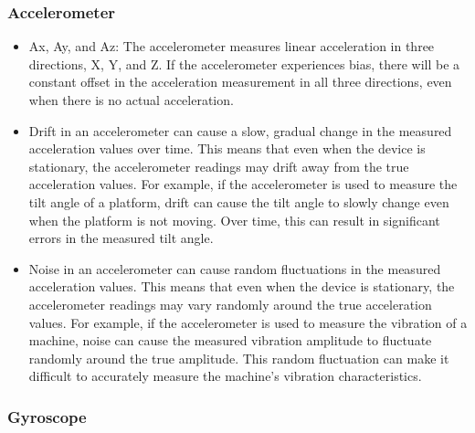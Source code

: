 \subsubsection{Accelerometer}
\begin{itemize}
	\item Ax, Ay, and Az: The accelerometer measures linear acceleration in three directions, X, Y, and Z. If the accelerometer experiences bias, there will be a constant offset in the acceleration measurement in all three directions, even when there is no actual acceleration. 
	\item Drift in an accelerometer can cause a slow, gradual change in the measured acceleration values over time. This means that even when the device is stationary, the accelerometer readings may drift away from the true acceleration values. For example, if the accelerometer is used to measure the tilt angle of a platform, drift can cause the tilt angle to slowly change even when the platform is not moving. Over time, this can result in significant errors in the measured tilt angle.
	\item Noise in an accelerometer can cause random fluctuations in the measured acceleration values. This means that even when the device is stationary, the accelerometer readings may vary randomly around the true acceleration values. For example, if the accelerometer is used to measure the vibration of a machine, noise can cause the measured vibration amplitude to fluctuate randomly around the true amplitude. This random fluctuation can make it difficult to accurately measure the machine's vibration characteristics.
\end{itemize}

\subsubsection{Gyroscope}

